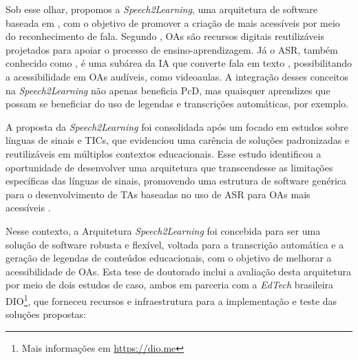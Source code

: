 Sob esse olhar, propomos a \textit{Speech2Learning}, uma arquitetura de software baseada em , com o objetivo de promover a criação de  mais acessíveis por meio do reconhecimento de fala. Segundo , OAs são recursos digitais reutilizáveis projetados para apoiar o processo de ensino-aprendizagem. Já o ASR, também conhecido como , é uma subárea da IA que converte fala em texto \cite{Jurafsky2024}, possibilitando a acessibilidade em OAs audíveis, como videoaulas. A integração desses conceitos na \textit{Speech2Learning} não apenas beneficia PcD, mas quaisquer aprendizes que possam se beneficiar do uso de legendas e transcrições automáticas, por exemplo.

A proposta da \textit{Speech2Learning} foi consolidada após um  focado em estudos sobre línguas de sinais e TICs, que evidenciou uma carência de soluções padronizadas e reutilizáveis em múltiplos contextos educacionais. Esse estudo identificou a oportunidade de desenvolver uma arquitetura que transcendesse as limitações específicas das línguas de sinais, promovendo uma estrutura de software genérica para o desenvolvimento de TAs baseadas no uso de ASR para OAs mais acessíveis \cite{FalvoJr2020_FIE, FalvoJr2020_SBIE, FalvoJr2021_RENOTE}.

Nesse contexto, a Arquitetura \textit{Speech2Learning} foi concebida para ser uma solução de software robusta e flexível, voltada para a transcrição automática e a geração de legendas de conteúdos educacionais, com o objetivo de melhorar a acessibilidade de OAs. Esta tese de doutorado inclui a avaliação desta arquitetura por meio de dois estudos de caso, ambos em parceria com a \textit{EdTech} brasileira DIO\footnote{Mais informações em \url{https://dio.me}}, que forneceu recursos e infraestrutura para a implementação e teste das soluções propostas:

